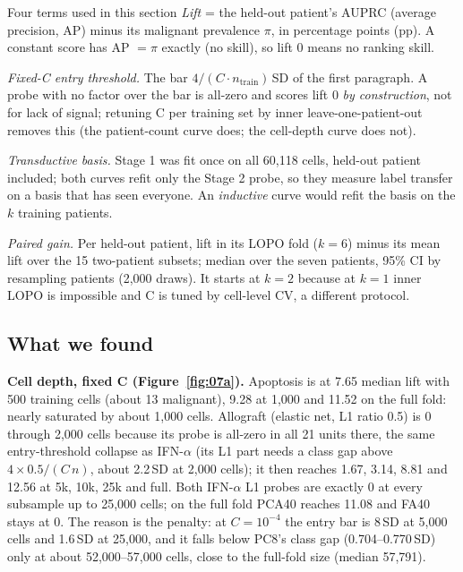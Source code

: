\begin{explainbox}{Four terms used in this section}
\emph{Lift} = the held-out patient's AUPRC (average precision, AP) minus its malignant prevalence $\pi$, in percentage points (pp). A constant score has AP $= \pi$ exactly (no skill), so lift 0 means no ranking skill.

\emph{Fixed-C entry threshold.} The bar $4/(C \cdot n_{\text{train}})$\,SD of the first paragraph. A probe with no factor over the bar is all-zero and scores lift 0 \emph{by construction}, not for lack of signal; retuning C per training set by inner leave-one-patient-out removes this (the patient-count curve does; the cell-depth curve does not).

\emph{Transductive basis.} Stage 1 was fit once on all 60,118 cells, held-out patient included; both curves refit only the Stage 2 probe, so they measure label transfer on a basis that has seen everyone. An \emph{inductive} curve would refit the basis on the $k$ training patients.

\emph{Paired gain.} Per held-out patient, lift in its LOPO fold ($k = 6$) minus its mean lift over the 15 two-patient subsets; median over the seven patients, 95\% CI by resampling patients (2,000 draws). It starts at $k = 2$ because at $k = 1$ inner LOPO is impossible and C is tuned by cell-level CV, a different protocol.
\end{explainbox}

\subsection*{What we found}

\textbf{Cell depth, fixed C (Figure~\ref{fig:07a}).} Apoptosis is at 7.65\pp{} median lift with 500 training cells (about 13 malignant), 9.28\pp{} at 1,000 and 11.52\pp{} on the full fold: nearly saturated by about 1,000 cells. Allograft (elastic net, L1 ratio 0.5) is 0 through 2,000 cells because its probe is all-zero in all 21 units there, the same entry-threshold collapse as IFN-$\alpha$ (its L1 part needs a class gap above $4 \times 0.5/(C\,n)$, about 2.2\,SD at 2,000 cells); it then reaches 1.67, 3.14, 8.81 and 12.56\pp{} at 5k, 10k, 25k and full. Both IFN-$\alpha$ L1 probes are exactly 0 at every subsample up to 25,000 cells; on the full fold PCA40 reaches 11.08\pp{} and FA40 stays at 0. The reason is the penalty: at $C = 10^{-4}$ the entry bar is 8\,SD at 5,000 cells and 1.6\,SD at 25,000, and it falls below PC8's class gap (0.704--0.770\,SD) only at about 52,000--57,000 cells, close to the full-fold size (median 57,791).

